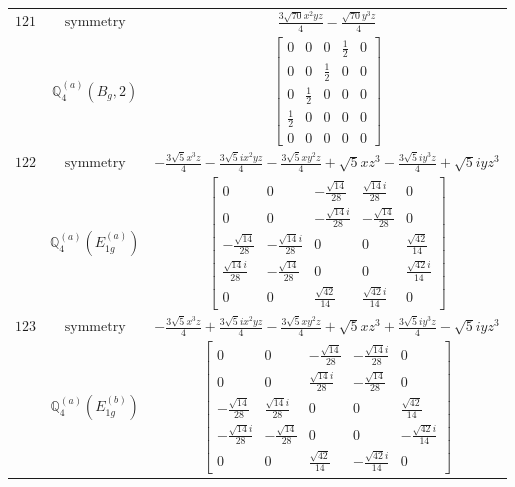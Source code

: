 \documentclass[fleqn,8pt,landscape]{jsarticle}
\begin{document}
\begin{longtable}{ccc}
$ 121 $ & $ \text{symmetry} $ & $ \frac{3 \sqrt{70} x^{2} y z}{4} - \frac{\sqrt{70} y^{3} z}{4} $ \\
$  $ & $ \mathbb{Q}_{4}^{(a)}(B_{g},2) $ & $ \begin{bmatrix} 0 & 0 & 0 & \frac{1}{2} & 0 \\ 0 & 0 & \frac{1}{2} & 0 & 0 \\ 0 & \frac{1}{2} & 0 & 0 & 0 \\ \frac{1}{2} & 0 & 0 & 0 & 0 \\ 0 & 0 & 0 & 0 & 0 \end{bmatrix} $ \\ \hline
$ 122 $ & $ \text{symmetry} $ & $ - \frac{3 \sqrt{5} x^{3} z}{4} - \frac{3 \sqrt{5} i x^{2} y z}{4} - \frac{3 \sqrt{5} x y^{2} z}{4} + \sqrt{5} x z^{3} - \frac{3 \sqrt{5} i y^{3} z}{4} + \sqrt{5} i y z^{3} $ \\
$  $ & $ \mathbb{Q}_{4}^{(a)}(E_{1g}^{(a)}) $ & $ \begin{bmatrix} 0 & 0 & - \frac{\sqrt{14}}{28} & \frac{\sqrt{14} i}{28} & 0 \\ 0 & 0 & - \frac{\sqrt{14} i}{28} & - \frac{\sqrt{14}}{28} & 0 \\ - \frac{\sqrt{14}}{28} & - \frac{\sqrt{14} i}{28} & 0 & 0 & \frac{\sqrt{42}}{14} \\ \frac{\sqrt{14} i}{28} & - \frac{\sqrt{14}}{28} & 0 & 0 & \frac{\sqrt{42} i}{14} \\ 0 & 0 & \frac{\sqrt{42}}{14} & \frac{\sqrt{42} i}{14} & 0 \end{bmatrix} $ \\ \hline
$ 123 $ & $ \text{symmetry} $ & $ - \frac{3 \sqrt{5} x^{3} z}{4} + \frac{3 \sqrt{5} i x^{2} y z}{4} - \frac{3 \sqrt{5} x y^{2} z}{4} + \sqrt{5} x z^{3} + \frac{3 \sqrt{5} i y^{3} z}{4} - \sqrt{5} i y z^{3} $ \\
$  $ & $ \mathbb{Q}_{4}^{(a)}(E_{1g}^{(b)}) $ & $ \begin{bmatrix} 0 & 0 & - \frac{\sqrt{14}}{28} & - \frac{\sqrt{14} i}{28} & 0 \\ 0 & 0 & \frac{\sqrt{14} i}{28} & - \frac{\sqrt{14}}{28} & 0 \\ - \frac{\sqrt{14}}{28} & \frac{\sqrt{14} i}{28} & 0 & 0 & \frac{\sqrt{42}}{14} \\ - \frac{\sqrt{14} i}{28} & - \frac{\sqrt{14}}{28} & 0 & 0 & - \frac{\sqrt{42} i}{14} \\ 0 & 0 & \frac{\sqrt{42}}{14} & - \frac{\sqrt{42} i}{14} & 0 \end{bmatrix} $ \\ \hline

\end{longtable}
\end{document}
